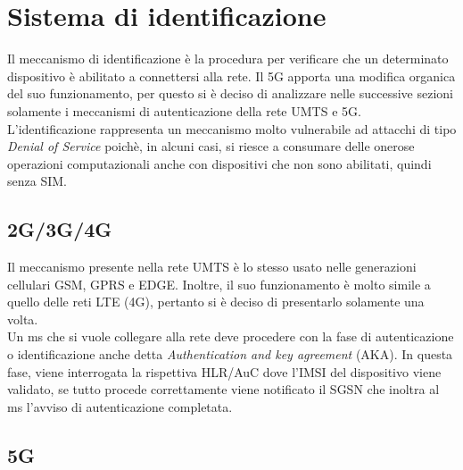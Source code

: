 \section{Sistema di identificazione}
Il meccanismo di identificazione è la procedura per verificare che un determinato dispositivo
è abilitato a connettersi alla rete. Il 5G apporta una modifica organica del suo funzionamento, per
questo si è deciso di analizzare nelle successive sezioni solamente i meccanismi di autenticazione della rete
UMTS e 5G.\\
L'identificazione rappresenta un meccanismo molto vulnerabile ad attacchi di tipo \textit{Denial of Service} poichè, 
in alcuni casi, si riesce a consumare delle onerose operazioni computazionali anche con dispositivi che non sono abilitati,
quindi senza SIM.

\subsection{2G/3G/4G}
Il meccanismo presente nella rete UMTS è lo stesso usato nelle generazioni cellulari GSM, GPRS e EDGE. Inoltre, il 
suo funzionamento è molto simile a quello delle reti LTE (4G), pertanto si è deciso di presentarlo solamente una volta.\\
Un \acrshort{ms} che si vuole collegare alla rete deve procedere con la fase di autenticazione o identificazione anche detta \textit{Authentication and key agreement}
(AKA). In questa fase, viene interrogata la rispettiva HLR/AuC dove l'IMSI del dispositivo viene validato, se tutto procede correttamente
viene notificato il SGSN che inoltra al \acrshort{ms} l'avviso di autenticazione completata.

\subsection{5G}